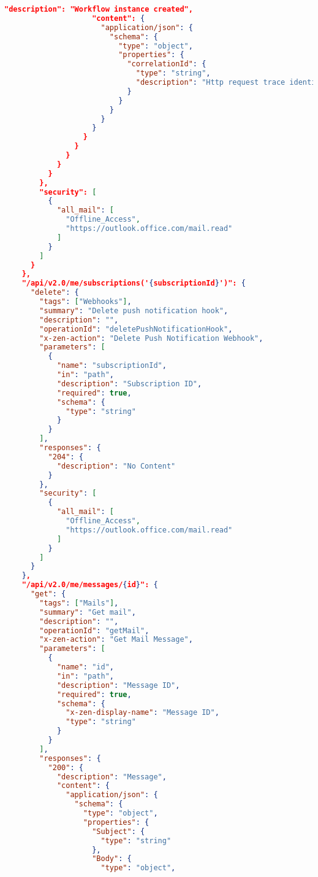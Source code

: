 \begin{lstlisting}[language=json,basicstyle=\ttfamily\tiny,numberstyle=\tiny]
                    "description": "Workflow instance created",
                    "content": {
                      "application/json": {
                        "schema": {
                          "type": "object",
                          "properties": {
                            "correlationId": {
                              "type": "string",
                              "description": "Http request trace identifier"
                            }
                          }
                        }
                      }
                    }
                  }
                }
              }
            }
          }
        },
        "security": [
          {
            "all_mail": [
              "Offline_Access",
              "https://outlook.office.com/mail.read"
            ]
          }
        ]
      }
    },
    "/api/v2.0/me/subscriptions('{subscriptionId}')": {
      "delete": {
        "tags": ["Webhooks"],
        "summary": "Delete push notification hook",
        "description": "",
        "operationId": "deletePushNotificationHook",
        "x-zen-action": "Delete Push Notification Webhook",
        "parameters": [
          {
            "name": "subscriptionId",
            "in": "path",
            "description": "Subscription ID",
            "required": true,
            "schema": {
              "type": "string"
            }
          }
        ],
        "responses": {
          "204": {
            "description": "No Content"
          }
        },
        "security": [
          {
            "all_mail": [
              "Offline_Access",
              "https://outlook.office.com/mail.read"
            ]
          }
        ]
      }
    },
    "/api/v2.0/me/messages/{id}": {
      "get": {
        "tags": ["Mails"],
        "summary": "Get mail",
        "description": "",
        "operationId": "getMail",
        "x-zen-action": "Get Mail Message",
        "parameters": [
          {
            "name": "id",
            "in": "path",
            "description": "Message ID",
            "required": true,
            "schema": {
              "x-zen-display-name": "Message ID",
              "type": "string"
            }
          }
        ],
        "responses": {
          "200": {
            "description": "Message",
            "content": {
              "application/json": {
                "schema": {
                  "type": "object",
                  "properties": {
                    "Subject": {
                      "type": "string"
                    },
                    "Body": {
                      "type": "object",

\end{lstlisting}
